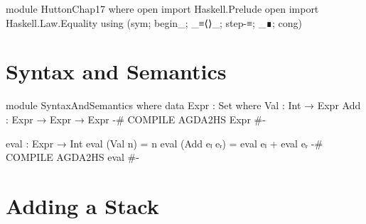 \documentclass{article}
\begin{document}
\begin{code}
module HuttonChap17 where
open import Haskell.Prelude
open import Haskell.Law.Equality using (sym; begin_; _≡⟨⟩_; step-≡; _∎; cong)
\end{code}

\section{Syntax and Semantics}

\begin{code}
module SyntaxAndSemantics where
  data Expr : Set where
      Val : Int → Expr
      Add : Expr → Expr → Expr
  {-# COMPILE AGDA2HS Expr #-}

  eval : Expr → Int
  eval (Val n) = n
  eval (Add eₗ eᵣ) = eval eₗ + eval eᵣ
  {-# COMPILE AGDA2HS eval #-}
\end{code}

\section{Adding a Stack}
\end{document}

